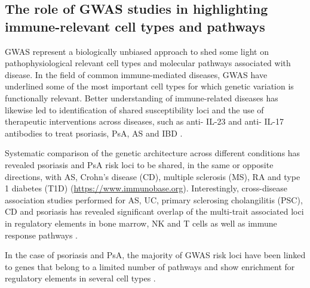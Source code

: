 \subsection{The role of GWAS studies in highlighting immune-relevant cell types and pathways}

GWAS represent a biologically unbiased approach to shed some light on pathophysiological relevant cell types and molecular pathways associated with disease. In the field of common immune-mediated diseases, GWAS have underlined some of the most important cell types for which genetic variation is functionally relevant. Better understanding of immune-related diseases has likewise led to identification of shared susceptibility loci and the use of therapeutic interventions across diseases, such as anti- IL-23 and anti- IL-17 antibodies to treat psoriasis, PsA, AS and IBD \parencite{Visscher2017}.

Systematic comparison of the genetic architecture across different conditions has revealed psoriasis and PsA risk loci to be shared, in the same or opposite directions, with AS, Crohn's disease (CD), multiple sclerosis (MS), RA and type 1 diabetes (T1D) (\url{https://www.immunobase.org}). Interestingly, cross-disease association studies performed for AS, UC, primary sclerosing cholangilitis (PSC), CD and psoriasis has revealed significant overlap  of the multi-trait associated loci in regulatory elements in bone marrow, NK and T cells as well as immune response pathways \parencite{Ellinghaus2016}. %

In the case of psoriasis and PsA, the majority of GWAS risk loci have been linked to genes that belong to a limited number of pathways and show enrichment for regulatory elements in several cell types \parencite{Capon2017}. 


